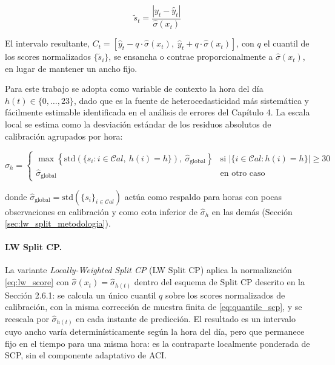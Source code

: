 \begin{equation}
    \tilde{s}_t = \frac{|y_t - \hat{y}_t|}{\hat{\sigma}(x_t)}
    \label{eq:lw_score}
\end{equation}

El intervalo resultante, $C_t = [\hat{y}_t - q \cdot \hat{\sigma}(x_t),\; \hat{y}_t + q \cdot \hat{\sigma}(x_t)]$, con $q$ el cuantil de los scores normalizados $\{\tilde{s}_i\}$, se ensancha o contrae proporcionalmente a $\hat{\sigma}(x_t)$, en lugar de mantener un ancho fijo.

Para este trabajo se adopta como variable de contexto la hora del día $h(t) \in \{0, \ldots, 23\}$, dado que es la fuente de heterocedasticidad más sistemática y fácilmente estimable identificada en el análisis de errores del Capítulo 4. La escala local se estima como la desviación estándar de los residuos absolutos de calibración agrupados por hora:

\begin{equation}
    \hat{\sigma}_h = \begin{cases}
        \max\left\{\text{std}\!\left(\{s_i : i \in \mathcal{C}al,\ h(i) = h\}\right),\ \hat{\sigma}_{\text{global}}\right\} & \text{si } \left|\{i \in \mathcal{C}al : h(i) = h\}\right| \geq 30 \\[4pt]
        \hat{\sigma}_{\text{global}} & \text{en otro caso}
    \end{cases}
    \label{eq:sigma_h}
\end{equation}

donde $\hat{\sigma}_{\text{global}} = \text{std}(\{s_i\}_{i \in \mathcal{C}al})$ actúa como respaldo para horas con pocas observaciones en calibración y como cota inferior de $\hat{\sigma}_h$ en las demás (Sección \ref{sec:lw_split_metodologia}).

\paragraph{LW Split CP.} La variante \textit{Locally-Weighted Split CP} (LW Split CP) aplica la normalización \eqref{eq:lw_score} con $\hat{\sigma}(x_t) = \hat{\sigma}_{h(t)}$ dentro del esquema de Split CP descrito en la Sección 2.6.1: se calcula un único cuantil $q$ sobre los scores normalizados de calibración, con la misma corrección de muestra finita de \eqref{eq:quantile_scp}, y se reescala por $\hat{\sigma}_{h(t)}$ en cada instante de predicción. El resultado es un intervalo cuyo ancho varía determinísticamente según la hora del día, pero que permanece fijo en el tiempo para una misma hora: es la contraparte localmente ponderada de SCP, sin el componente adaptativo de ACI.


